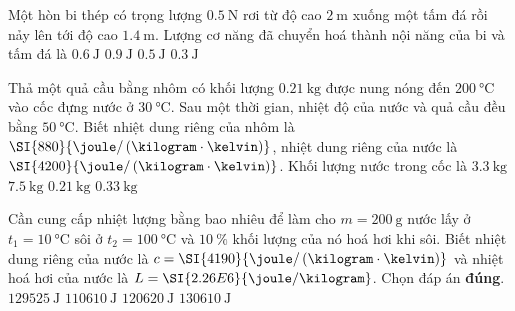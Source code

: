\begin{ex}
Một hòn bi thép có trọng lượng $\SI{0.5}{\newton}$ rơi từ độ cao $\SI{2}{\meter}$ xuống một tấm đá rồi nảy lên tới độ cao $\SI{1.4}{\meter}$. Lượng cơ năng đã chuyển hoá thành nội năng của bi và tấm đá là
	\choice
	{$\SI{0.6}{\joule}$}
	{$\SI{0.9}{\joule}$}
	{$\SI{0.5}{\joule}$}
	{\True $\SI{0.3}{\joule}$}
\end{ex}

\begin{ex}
Thả một quả cầu bằng nhôm có khối lượng $\SI{0.21}{\kilogram}$ được nung nóng đến $\SI{200}{\celsius}$ vào cốc đựng nước ở $\SI{30}{\celsius}$. Sau một thời gian, nhiệt độ của nước và quả cầu đều bằng $\SI{50}{\celsius}$. Biết nhiệt dung riêng của nhôm là $\SI{880}{\joule/\left(\kilogram\cdot\kelvin\right)}$, nhiệt dung riêng của nước là $\SI{4200}{\joule/\left(\kilogram\cdot\kelvin\right)}$. Khối lượng nước trong cốc là	
	\choice
	{$\SI{3.3}{\kilogram}$}
	{$\SI{7.5}{\kilogram}$}
	{$\SI{0.21}{\kilogram}$}
	{\True $\SI{0.33}{\kilogram}$}

\end{ex}
\begin{ex}
Cần cung cấp nhiệt lượng bằng bao nhiêu để làm cho $m=\SI{200}{\gram}$ nước lấy ở $t_1=\SI{10}{\celsius}$ sôi ở $t_2=\SI{100}{\celsius}$ và $\SI{10}{\percent}$ khối lượng của nó hoá hơi khi sôi. Biết nhiệt dung riêng của nước là $c=\SI{4190}{\joule/\left(
	\kilogram\cdot\kelvin\right)}$ và nhiệt hoá hơi của nước là $L=\SI{2.26E6}{\joule/\kilogram}$. Chọn đáp án \textbf{đúng}.
	\choice
	{$\SI{129525}{\joule}$}
	{$\SI{110610}{\joule}$}
	{\True $\SI{120620}{\joule}$}
	{$\SI{130610}{\joule}$}
\end{ex}

